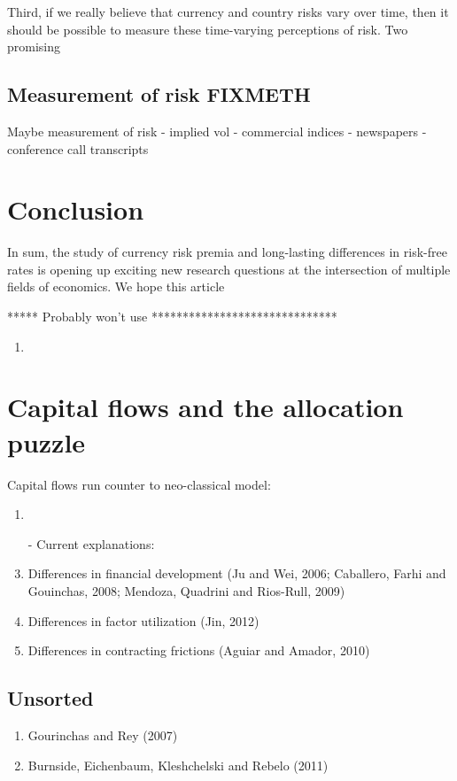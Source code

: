 \documentclass{ar-1col}
\begin{document}
Third, if we really believe that currency and country risks vary over time, then it should be possible to measure these time-varying perceptions of risk. Two promising 



\subsection{Measurement of risk FIXMETH}
Maybe measurement of risk - implied vol - commercial indices - newspapers - conference call transcripts


\section{Conclusion}

In sum, the study of currency risk premia and long-lasting differences in risk-free rates is opening up exciting new research questions at the intersection of multiple fields of economics. We hope this article  

***** Probably won't use ******************************


\begin{enumerate}
    \item \citet{Backusetal2001}
\end{enumerate}

\section*{Capital flows and the allocation puzzle}
Capital flows run counter to neo-classical model:
\begin{enumerate}
\item \citet{GourinchasJeanne2013}
\item[-] Current explanations:
\item Differences in financial development (Ju and Wei, 2006;
  Caballero, Farhi and Gouinchas, 2008; Mendoza, Quadrini and
  Rios-Rull, 2009)
\item Differences in factor utilization (Jin, 2012)
\item Differences in contracting frictions (Aguiar and Amador, 2010)
\end{enumerate}


\subsection{Unsorted}
\begin{enumerate}
\item Gourinchas and Rey (2007)
\item Burnside, Eichenbaum, Kleshchelski and Rebelo (2011)
\end{enumerate}
\end{document}
